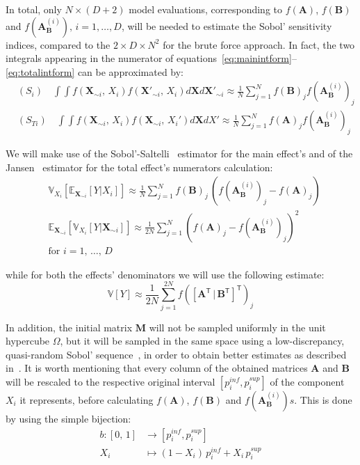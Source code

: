 \noindent
In total, only $N\times (D + 2)$ model evaluations, corresponding to $f(\mathbf{A})$, $f(\mathbf{B})$ and $f(\mathbf{A}_{\mathbf{B}}^{(i)}),\,i=1,\dots,D$, will be needed to estimate the Sobol' sensitivity indices, compared to the $2\times D\times N^2$ for the brute force approach. In fact, the two integrals appearing in the numerator of equations~\eqref{eq:mainintform}--\eqref{eq:totalintform} can be approximated by:
%
\begin{align}
    & (S_{i})\quad \int\int f(\mathbf{X}_{\sim i},\, X_i)f(\mathbf{X'}_{\sim i},\, X_i)d\mathbf{X}d\mathbf{X'}_{\sim i} \approx \frac{1}{N}\sum_{j=1}^{N} f(\mathbf{B})_{j}f(\mathbf{A}_{\mathbf{B}}^{(i)})_{j} \\
    & (S_{Ti})\quad \int\int f(\mathbf{X}_{\sim i},\, X_i)f(\mathbf{X}_{\sim i},\, X_i')d\mathbf{X}dX' \approx \frac{1}{N}\sum_{j=1}^{N} f(\mathbf{A})_{j}f(\mathbf{A}_{\mathbf{B}}^{(i)})_{j}
\end{align}


\vspace{0.2cm}
We will make use of the Sobol'-Saltelli~\cite{Saltelli:2010} estimator for the main effect's and of the Jansen~\cite{Jansen:1999} estimator for the total effect's numerators calculation:
%
\begin{align}\label{eq:gsaestimators}
    & \mathbb{V}_{X_i}[\mathbb{E}_{\mathbf{X}_{\sim i}}[Y|X_i]] \approx \frac{1}{N}\sum_{j=1}^{N}f(\mathbf{B})_j\,(f(\mathbf{A}_{\mathbf{B}}^{(i)})_j - f(\mathbf{A})_j) \\
    & \mathbb{E}_{\mathbf{X}_{\sim i}}[\mathbb{V}_{X_i}[Y|\mathbf{X}_{\sim i}]] \approx \frac{1}{2N}\sum_{j=1}^{N}(f(\mathbf{A})_j-f(\mathbf{A}_{\mathbf{B}}^{(i)})_j)^2 \\
    & \text{for}\,\,i=1,\,\dots,\,D
\end{align}

\noindent
while for both the effects' denominators we will use the following estimate:
%
\begin{equation}\label{eq:varianceestimate}
    \mathbb{V}[Y] \approx \frac{1}{2N} \sum_{j=1}^{2N} f([\mathbf{A}^\mathsf{T}\,|\,\mathbf{B}^\mathsf{T}]^\mathsf{T})_j
\end{equation}

\noindent
In addition, the initial matrix $\mathbf{M}$ will not be sampled uniformly in the unit hypercube $\Omega$, but it will be sampled in the same space using a low-discrepancy, quasi-random Sobol' sequence~\cite{Sobol:1967}, in order to obtain better estimates as described in~\cite{Saltelli:2010}. It is worth mentioning that every column of the obtained matrices $\mathbf{A}$ and $\mathbf{B}$ will be rescaled to the respective original interval $[p_i^{inf}, p_i^{sup}]$ of the component $X_i$ it represents, before calculating $f(\mathbf{A})$, $f(\mathbf{B})$ and $f(\mathbf{A}_{\mathbf{B}}^{(i)})s$. This is done by using the simple bijection:
%
\begin{align}
    b \colon [0,\,1] &\to [p_i^{inf}, p_i^{sup}] \\
    X_i &\mapsto (1 - X_i)\,p_i^{inf} + X_i\,p_i^{sup}
\end{align}

